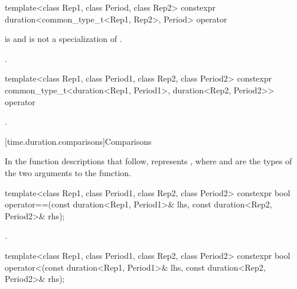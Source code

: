 %
\begin{itemdecl}
template<class Rep1, class Period, class Rep2>
  constexpr duration<common_type_t<Rep1, Rep2>, Period>
    operator%
\end{itemdecl}

\begin{itemdescr}
\pnum
\constraints
{} is  and
 is not a specialization of .

\pnum
\returns
{}.
\end{itemdescr}

%
\begin{itemdecl}
template<class Rep1, class Period1, class Rep2, class Period2>
  constexpr common_type_t<duration<Rep1, Period1>, duration<Rep2, Period2>>
    operator%
\end{itemdecl}

\begin{itemdescr}
\pnum
\returns
{}.
\end{itemdescr}


[time.duration.comparisons]{Comparisons}

\pnum
In the function descriptions that follow,  represents
, where  and  are the types of
the two arguments to the function.

%
\begin{itemdecl}
template<class Rep1, class Period1, class Rep2, class Period2>
  constexpr bool operator==(const duration<Rep1, Period1>& lhs,
                            const duration<Rep2, Period2>& rhs);
\end{itemdecl}

\begin{itemdescr}
\pnum
\returns
{}.
\end{itemdescr}

%
\begin{itemdecl}
template<class Rep1, class Period1, class Rep2, class Period2>
  constexpr bool operator<(const duration<Rep1, Period1>& lhs,
                           const duration<Rep2, Period2>& rhs);
\end{itemdecl}

